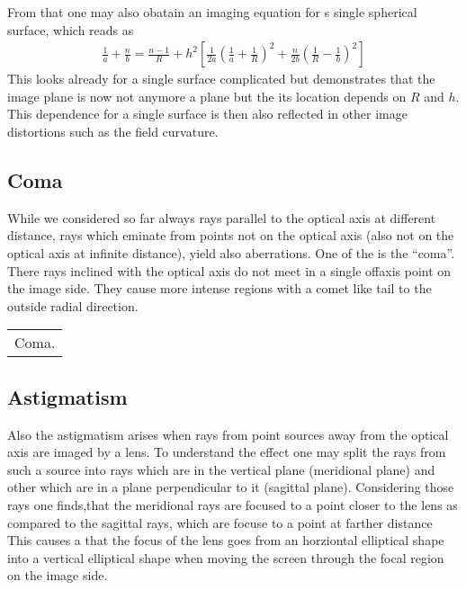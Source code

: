 \documentclass[letterpaper,10pt,english]{sphinxmanual}
\begin{document}
From that one may also obatain an imaging equation for s single spherical surface, which reads as
\begin{equation*}
\begin{split}\frac{1}{a}+\frac{n}{b}=\frac{n-1}{R}+h^2\left [ \frac{1}{2a}\left ( \frac{1}{a}+\frac{1}{R}\right )^2 +\frac{n}{2b}\left ( \frac{1}{R}-\frac{1}{b}\right )^2\right]\end{split}
\end{equation*}
This looks already for a single surface complicated but demonstrates that the image plane is now not anymore a plane but the its location depends on \(R\) and \(h\). This dependence for a single surface is then also reflected in other image distortions such as the field curvature.


\subsection{Coma}
\label{\detokenize{notebooks/L7/Imaging Errors:Coma}}
While we considered so far always rays parallel to the optical axis at different distance, rays which eminate from points not on the optical axis (also not on the optical axis at infinite distance), yield also aberrations. One of the is the “coma”. There rays inclined with the optical axis do not meet in a single off\sphinxhyphen{}axis point on the image side. They cause more intense regions with a comet like tail to the outside radial direction.


\begin{savenotes}\sphinxattablestart
\centering
\begin{tabulary}{\linewidth}[t]{|T|}
\hline
\sphinxstyletheadfamily 
{} 
\\
\hline
{} Coma.
\\
\hline
\end{tabulary}
\par
\sphinxattableend\end{savenotes}


\subsection{Astigmatism}
\label{\detokenize{notebooks/L7/Imaging Errors:Astigmatism}}
Also the astigmatism arises when rays from point sources away from the optical axis are imaged by a lens. To understand the effect one may split the rays from such a source into rays which are in the vertical plane (meridional plane) and other which are in a plane perpendicular to it (sagittal plane). Considering those rays one finds,that the meridional rays are focused to a point closer to the lens as compared to the sagittal rays, which are focuse to a point at farther distance\sphinxhyphen{} This causes a
that the focus of the lens goes from an horziontal elliptical shape into a vertical elliptical shape when moving the screen through the focal region on the image side.
\end{document}
